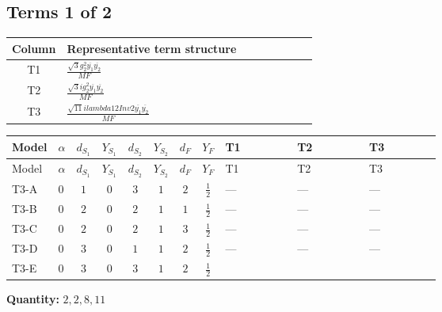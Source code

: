 \documentclass[8pt]{article}
\begin{document}
\begin{landscape}
\subsection*{Terms 1 of 2}
\begin{center}
\begin{tabular}{@{}c >{\raggedright\arraybackslash}p{0.82\linewidth}@{}}
\toprule
Column & Representative term structure \\
\midrule
T1 & \(\displaystyle \frac{\sqrt{3} g_{2}^{2} \overline{y_{1}} \overline{y_{2}}}{MF}\) \\
\midrule
T2 & \(\displaystyle \frac{\sqrt{3} i g_{2}^{2} \overline{y_{1}} \overline{y_{2}}}{MF}\) \\
\midrule
T3 & \(\displaystyle \frac{\sqrt{11} i lambda12Inv2 \overline{y_{1}} \overline{y_{2}}}{MF}\) \\
\midrule
\bottomrule
\end{tabular}
\end{center}
\smallskip
\tiny
\begin{longtable}{@{}llcccccc >{\raggedright\arraybackslash}p{0.21\linewidth} >{\raggedright\arraybackslash}p{0.21\linewidth} >{\raggedright\arraybackslash}p{0.21\linewidth}@{}}
\toprule
Model & $\alpha$ & $d_{S_1}$ & $Y_{S_1}$ & $d_{S_2}$ & $Y_{S_2}$ & $d_F$ & $Y_F$ & T1 & T2 & T3 \\
\midrule
\endfirsthead
\toprule
Model & $\alpha$ & $d_{S_1}$ & $Y_{S_1}$ & $d_{S_2}$ & $Y_{S_2}$ & $d_F$ & $Y_F$ & T1 & T2 & T3 \\
\midrule
\endhead
T3-A & $0$ & $1$ & $0$ & $3$ & $1$ & $2$ & $\frac{1}{2}$ & --- & --- & --- \\
\midrule
T3-B & $0$ & $2$ & $0$ & $2$ & $1$ & $1$ & $\frac{1}{2}$ & --- & --- & --- \\
\midrule
T3-C & $0$ & $2$ & $0$ & $2$ & $1$ & $3$ & $\frac{1}{2}$ & --- & --- & --- \\
\midrule
T3-D & $0$ & $3$ & $0$ & $1$ & $1$ & $2$ & $\frac{1}{2}$ & --- & --- & --- \\
\midrule
T3-E & $0$ & $3$ & $0$ & $3$ & $1$ & $2$ & $\frac{1}{2}$ & \scriptsize\adjustbox{max width=\linewidth}{$\begin{gathered} - \frac{\sqrt{3} g_{2}^{2} \overline{y_{1}} \overline{y_{2}}}{6 MF}\end{gathered}$} & \scriptsize\adjustbox{max width=\linewidth}{$\begin{gathered} - \frac{11 \sqrt{3} i g_{2}^{2} \overline{y_{1}} \overline{y_{2}}}{8 MF}\end{gathered}$} & \scriptsize\adjustbox{max width=\linewidth}{$\begin{gathered} - \frac{3 \sqrt{11} i lambda12Inv2 \overline{y_{1}} \overline{y_{2}}}{22 MF}\end{gathered}$} \\
\midrule
\bottomrule
\end{longtable}
\clearpage
\noindent\textbf{Quantity: }$\mathrm{2,2,8,11}$\par\smallskip

\end{landscape}
\end{document}
